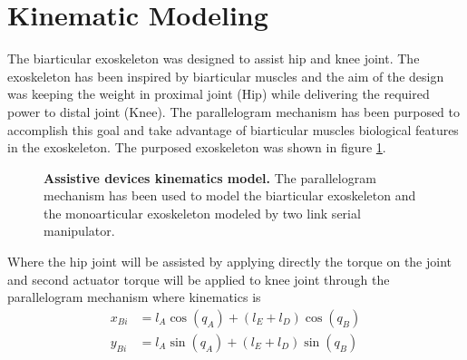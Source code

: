 \documentclass[10pt,letterpaper]{article}
\begin{document}
\section*{Kinematic Modeling}
The biarticular exoskeleton was designed to assist hip and knee joint. The exoskeleton has been inspired by biarticular muscles and the aim of the design was keeping the weight in proximal joint (Hip) while delivering the required power to distal joint (Knee). The parallelogram mechanism has been purposed to accomplish this goal and take advantage of biarticular muscles biological features in the exoskeleton.  The purposed exoskeleton was shown in figure \ref{Fig_Exos_Kinematics_Model}.

\begin{figure}[h!]
	\centering
	\hfil
	\vspace{1mm}
	\caption{\small{\textbf{Assistive devices kinematics model.} The parallelogram mechanism has been used to model the biarticular exoskeleton and the monoarticular exoskeleton modeled by two link serial manipulator.}}
	\label{Fig_Exos_Kinematics_Model}
\end{figure}
Where the hip joint will be assisted by applying directly the torque on the joint and second actuator torque will be applied to knee joint through the parallelogram mechanism where kinematics is 
\begin{align}\label{Eqn_Bi_Kin}
x_{Bi} &= l_ {A}\cos (q_ {A}) + (l_ {E} + l_ {D})\cos (q_ {B})\\
y_{Bi} &= l_ {A}\sin (q_ {A}) + (l_ {E} + l_ {D})\sin (q_ {B})
\end{align}
\end{document}
